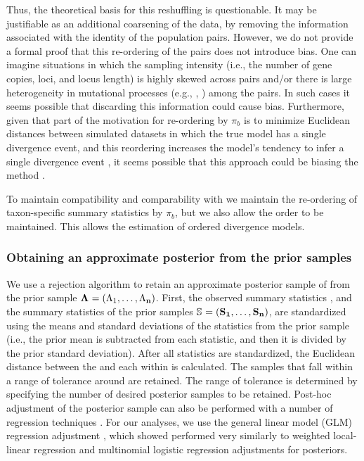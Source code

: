 \documentclass[letterpaper,12pt]{article}
\begin{document}
\begin{linenumbers}
Thus, the theoretical basis for this reshuffling is questionable.
It may be justifiable as an additional coarsening of the data,
by removing the information associated with the identity of the
population pairs.
However, we do not provide a formal proof that this re-ordering of the pairs
does not introduce bias.
One can imagine situations in which the sampling intensity (i.e., the
number of gene copies, loci, and locus length) is highly skewed across
pairs and/or there is large heterogeneity in mutational processes
(e.g., \hkyModel{}{}, \mutationRateScalarConstant{}{}) among the pairs.
In such cases it seems possible that discarding this information could
cause bias.
Furthermore, given that part of the motivation for re-ordering by $\pi_b$ is to
minimize Euclidean distances between simulated datasets in which the true model
has a single divergence event, and this reordering increases the model's
tendency to infer a single divergence event \citep{Huang2011}, it seems
possible that this approach could be biasing the method \citet{Oaks2012}.

To maintain compatibility and comparability with \msb we maintain
the re-ordering of taxon-specific summary statistics by $\pi_b$, but
we also allow the order to be maintained.
This allows the estimation of ordered divergence models.

\subsubsection*{Obtaining an approximate posterior from the prior samples}
We use a rejection algorithm to retain an approximate posterior sample of
\paramSampleVector{} from the prior sample
$\boldsymbol{\Lambda_{}} = (\Lambda_{1}, \ldots, \Lambda_{\mathbf{n}})$.
First, the observed summary statistics \ssVectorObs, and the summary statistics
of the prior samples 
$\ssMatrix = (\ssVector{1}, \ldots, \ssVector{\numPriorSamples})$,
are standardized using the means and standard deviations of the statistics from
the prior sample (i.e., the prior mean is subtracted from each statistic, and then
it is divided by the prior standard deviation).
After all statistics are standardized, the Euclidean distance between
the \ssVectorObs and each \ssVector{} within \ssMatrix is calculated.
The samples that fall within a range of tolerance \tol around \ssVectorObs
are retained.
The range of tolerance is determined by specifying the number of desired
posterior samples to be retained.
Post-hoc adjustment of the posterior sample can also be performed with a number
of regression techniques \citep{Beaumont2002,Blum2009,Leuenberger2010}.
For our analyses, we use the general linear model (GLM) regression adjustment
\citet{Leuenberger2010}, which \citet{Oaks2012} showed performed very
similarly to weighted local-linear regression and multinomial logistic
regression adjustments \citep{Beaumont2002} for \msb posteriors.



\end{linenumbers}
\end{document}
